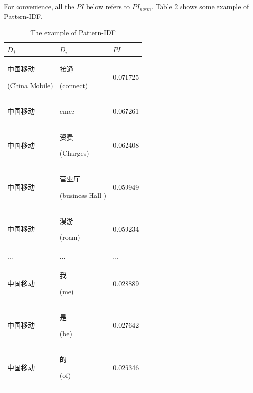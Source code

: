 \documentclass{sig-alternate}
\begin{document}
For convenience, all the $PI$ below refers to $PI_{norm}$. Table 2 shows some example of Pattern-IDF.
\begin{table}[]
\centering
\caption{The example of Pattern-IDF}
\label{my-label}
\begin{tabular}{lll}
\hline
 $D_j$ & $D_i$ & $PI$ \\ \hline
 \begin{CJK}{UTF8}{gbsn}中国移动\end{CJK} (China Mobile) & \begin{CJK}{UTF8}{gbsn}接通\end{CJK} (connect)   & 0.071725 \\ \hline
 \begin{CJK}{UTF8}{gbsn}中国移动\end{CJK} & cmcc                                  & 0.067261 \\ \hline
 \begin{CJK}{UTF8}{gbsn}中国移动\end{CJK} & \begin{CJK}{UTF8}{gbsn}资费\end{CJK} (Charges)   & 0.062408 \\ \hline
 \begin{CJK}{UTF8}{gbsn}中国移动\end{CJK} & \begin{CJK}{UTF8}{gbsn}营业厅\end{CJK} (business Hall
) & 0.059949 \\ \hline
 \begin{CJK}{UTF8}{gbsn}中国移动\end{CJK} & \begin{CJK}{UTF8}{gbsn}漫游\end{CJK} (roam)   & 0.059234 \\ \hline
 ... & ...  & ...  \\ \hline
 \begin{CJK}{UTF8}{gbsn}中国移动\end{CJK} & \begin{CJK}{UTF8}{gbsn}我\end{CJK} (me)   & 0.028889 \\ \hline
 \begin{CJK}{UTF8}{gbsn}中国移动\end{CJK} & \begin{CJK}{UTF8}{gbsn}是\end{CJK} (be)   & 0.027642 \\ \hline
 \begin{CJK}{UTF8}{gbsn}中国移动\end{CJK} & \begin{CJK}{UTF8}{gbsn}的\end{CJK} (of)   & 0.026346 \\ \hline
\end{tabular}
\end{table}
\end{document}
